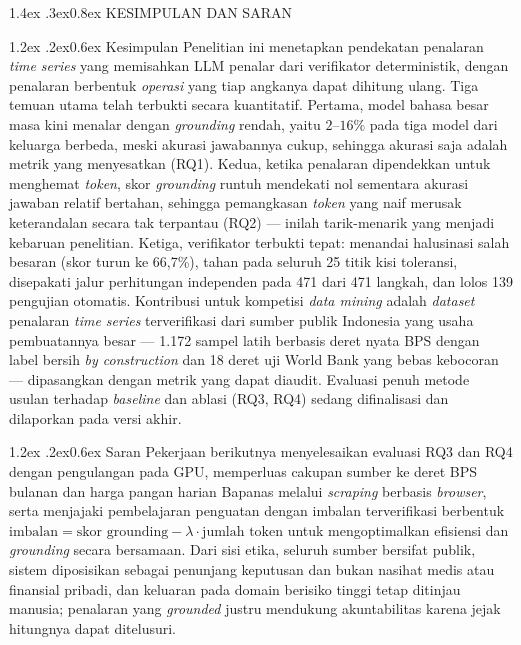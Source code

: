 \documentclass[10pt,a4paper,twocolumn]{article}
\makeatletter
\renewcommand\section{\@startsection{section}{1}{\z@}%
  {1.4ex \@plus .3ex}{0.8ex}%
  {\normalfont\small\bfseries}}
\renewcommand\subsection{\@startsection{subsection}{2}{\z@}%
  {1.2ex \@plus .2ex}{0.6ex}%
  {\normalfont\small\bfseries\itshape}}
\makeatother
\begin{document}
\section{KESIMPULAN DAN SARAN}

\subsection{Kesimpulan}
Penelitian ini menetapkan pendekatan penalaran \textit{time series} yang
memisahkan LLM penalar dari verifikator deterministik, dengan penalaran berbentuk
\textit{operasi} yang tiap angkanya dapat dihitung ulang. Tiga temuan utama telah
terbukti secara kuantitatif. Pertama, model bahasa besar masa kini menalar dengan
\textit{grounding} rendah, yaitu $2$--$16\%$ pada tiga model dari keluarga
berbeda, meski akurasi jawabannya cukup, sehingga akurasi saja adalah metrik yang
menyesatkan (RQ1). Kedua, ketika penalaran dipendekkan untuk menghemat
\textit{token}, skor \textit{grounding} runtuh mendekati nol sementara akurasi
jawaban relatif bertahan, sehingga pemangkasan \textit{token} yang naif merusak
keterandalan secara tak terpantau (RQ2) --- inilah tarik-menarik yang menjadi
kebaruan penelitian. Ketiga, verifikator terbukti tepat: menandai halusinasi
salah besaran (skor turun ke 66,7\%), tahan pada seluruh 25 titik kisi toleransi,
disepakati jalur perhitungan independen pada 471 dari 471 langkah, dan lolos 139
pengujian otomatis. Kontribusi untuk kompetisi \textit{data mining} adalah
\textit{dataset} penalaran \textit{time series} terverifikasi dari sumber publik
Indonesia yang usaha pembuatannya besar --- 1.172 sampel latih berbasis deret
nyata BPS dengan label bersih \textit{by construction} dan 18 deret uji World
Bank yang bebas kebocoran --- dipasangkan dengan metrik yang dapat diaudit.
Evaluasi penuh metode usulan terhadap \textit{baseline} dan ablasi (RQ3, RQ4)
sedang difinalisasi dan dilaporkan pada versi akhir.

\subsection{Saran}
Pekerjaan berikutnya menyelesaikan evaluasi RQ3 dan RQ4 dengan pengulangan pada
GPU, memperluas cakupan sumber ke deret BPS bulanan dan harga pangan harian
Bapanas melalui \textit{scraping} berbasis \textit{browser}, serta menjajaki
pembelajaran penguatan dengan imbalan terverifikasi berbentuk
$\text{imbalan} = \text{skor grounding} - \lambda\cdot\text{jumlah token}$ untuk
mengoptimalkan efisiensi dan \textit{grounding} secara bersamaan. Dari sisi etika,
seluruh sumber bersifat publik, sistem diposisikan sebagai penunjang keputusan
dan bukan nasihat medis atau finansial pribadi, dan keluaran pada domain berisiko
tinggi tetap ditinjau manusia; penalaran yang \textit{grounded} justru mendukung
akuntabilitas karena jejak hitungnya dapat ditelusuri.
\end{document}
